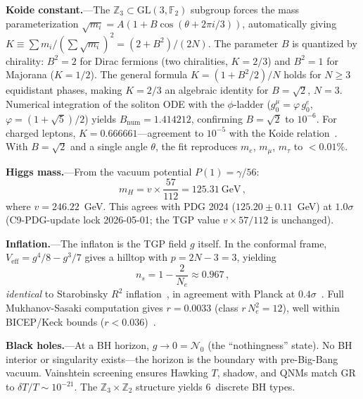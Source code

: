 \documentclass[aps,prl,twocolumn,superscriptaddress,showpacs,floatfix]{revtex4-2}
\newcommand{\Nzero}{\mathcal{N}_0}
\newcommand{\GL}{\mathrm{GL}(3,\mathbb{F}_2)}
\begin{document}
\textbf{Koide constant.}---The $\mathbb{Z}_3 \subset \GL$ subgroup
forces the mass parameterization
$\sqrt{m_i} = A(1 + B\cos(\theta + 2\pi i/3))$,
automatically giving
$K \equiv \sum m_i / (\sum\!\sqrt{m_i})^2 = (2{+}B^2)/(2N)$.
The parameter $B$ is quantized by chirality:
$B^2 = 2$ for Dirac fermions (two chiralities, $K = 2/3$)
and $B^2 = 1$ for Majorana ($K = 1/2$).
The general formula $K = (1 + B^2/2)/N$ holds for $N \geq 3$ equidistant
phases, making $K = 2/3$ an algebraic identity for $B = \sqrt{2}$, $N = 3$.
Numerical integration of the soliton ODE with the $\phi$-ladder
($g_0^\mu = \varphi\,g_0^e$, $\varphi = (1+\sqrt{5})/2$) yields
$B_\mathrm{num} = 1.414212$, confirming $B = \sqrt{2}$ to $10^{-6}$.
For charged leptons, $K = 0.666661$---agreement to $10^{-5}$
with the Koide relation~\cite{Koide1982}.
With $B = \sqrt{2}$ and a single angle $\theta$, the fit reproduces
$m_e$, $m_\mu$, $m_\tau$ to $< 0.01\%$.

\textbf{Higgs mass.}---From the vacuum potential $P(1) = \gamma/56$:
\begin{equation}\label{eq:mH}
  m_H = v \times \frac{57}{112} = 125.31~\text{GeV}\,,
\end{equation}
where $v = 246.22$~GeV.
This agrees with PDG 2024 ($125.20 \pm 0.11$~GeV) at $1.0\sigma$~\cite{PDG2024}
(C9-PDG-update lock 2026-05-01; the TGP value $v\times 57/112$ is unchanged).

\textbf{Inflation.}---The inflaton is the TGP field $g$ itself.
In the conformal frame, $V_{\mathrm{eff}} = g^4/8 - g^3/7$ gives
a hilltop with $p = 2N{-}3 = 3$, yielding
\begin{equation}\label{eq:ns}
  n_s = 1 - \frac{2}{N_e} \approx 0.967\,,
\end{equation}
\emph{identical} to Starobinsky $R^2$ inflation~\cite{Starobinsky1980},
in agreement with Planck at $0.4\sigma$~\cite{Planck2018}.
Full Mukhanov-Sasaki computation gives $r = 0.0033$
(class $r\,N_e^2 = 12$), well within BICEP/Keck bounds
($r < 0.036$)~\cite{BICEP}.

\textbf{Black holes.}---At a BH horizon, $g \to 0 = \Nzero$
(the ``nothingness'' state).
No BH interior or singularity exists---the horizon is the boundary with
pre-Big-Bang vacuum.
Vainshtein screening ensures Hawking $T$, shadow, and QNMs match
GR to $\delta T/T \sim 10^{-21}$.
The $\mathbb{Z}_3 \times \mathbb{Z}_2$ structure yields 6~discrete BH types.
\end{document}
